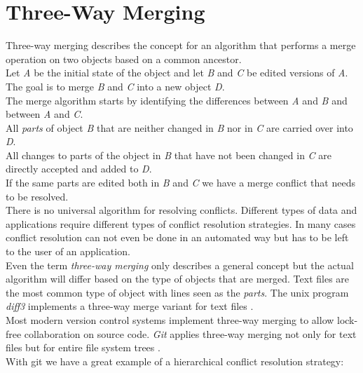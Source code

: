 \section{Three-Way Merging}
\label{sec:background.merging}
Three-way merging describes the concept for an algorithm that performs a merge operation on two objects based on a common ancestor.\\
Let \emph{A} be the initial state of the object and let \emph{B} and \emph{C} be edited versions of \emph{A}.
The goal is to merge \emph{B} and \emph{C} into a new object \emph{D}.\\
The merge algorithm starts by identifying the differences between \emph{A} and \emph{B} and between \emph{A} and \emph{C}.\\
All \emph{parts} of object \emph{B} that are neither changed in \emph{B} nor in \emph{C} are carried over into \emph{D}.\\
All changes to parts of the object in \emph{B} that have not been changed in \emph{C} are directly accepted and added to \emph{D}.\\
If the same parts are edited both in \emph{B} and \emph{C} we have a merge conflict that needs to be resolved.\\
There is no universal algorithm for resolving conflicts.
Different types of data and applications require different types of conflict resolution strategies.
In many cases conflict resolution can not even be done in an automated way but has to be left to the user of an application.\\
Even the term \emph{three-way merging} only describes a general concept but the actual algorithm will differ based on the type of objects that are merged.
Text files are the most common type of object with lines seen as the \emph{parts}.
The unix program \emph{diff3} implements a three-way merge variant for text files \cite{diff3}.\\
Most modern version control systems implement three-way merging to allow lock-free collaboration on source code.
\emph{Git} applies three-way merging not only for text files but for entire file system trees \cite{git}.\\
With git we have a great example of a hierarchical conflict resolution strategy:

